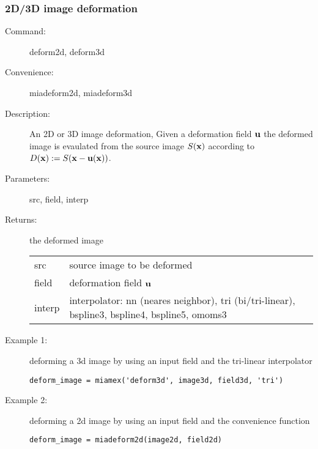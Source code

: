 \subsubsection*{2D/3D image deformation}

\begin{description}
\item [Command:] deform2d, deform3d
\item [Convenience:] miadeform2d, miadeform3d
\item [Description:] An 2D or 3D image deformation, Given a deformation field $\mathbf{u}$ the deformed image is
   evaulated from the source image $S(\mathbf{x})$ according to $D(\mathbf{x}) := S(\mathbf{x} - \mathbf{u}(\mathbf{x}))$. 
\item [Parameters:] src, field, interp
\item [Returns:] the deformed image

\begin{tabular}{ll}
src & source image  to be deformed \\
field & deformation field $\mathbf{u}$ \\
interp & interpolator: nn (neares neighbor), tri (bi/tri-linear), bspline3, bspline4, bspline5, omoms3\\
\end{tabular}
\item [Example 1:] deforming a 3d image by using an input field and the tri-linear interpolator
\begin{lstlisting}
deform_image = miamex('deform3d', image3d, field3d, 'tri')
\end{lstlisting}
\item [Example 2:] deforming a 2d image by using an input field and the convenience function
\begin{lstlisting}
deform_image = miadeform2d(image2d, field2d)
\end{lstlisting}
\end{description}





